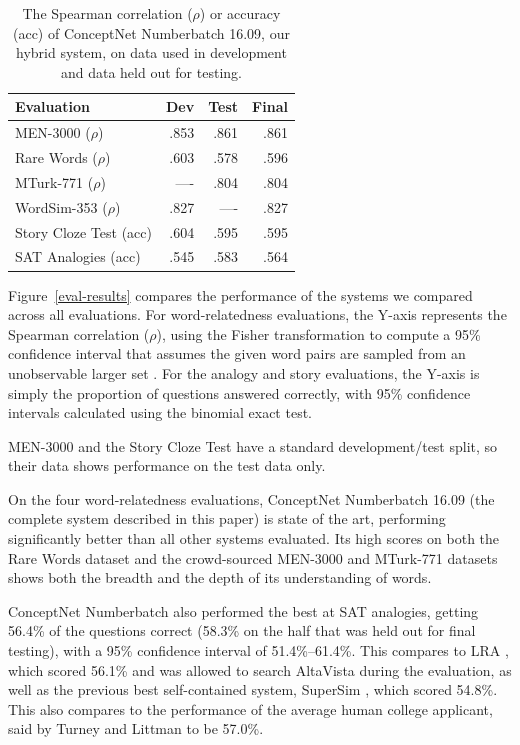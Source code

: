 \documentclass[letterpaper]{article}
\begin{document}
\begin{table}[t]
\centering
\begin{tabular}{lrrr}
\bf Evaluation     & \bf Dev & \bf Test & \bf Final \\
\hline
MEN-3000 ($\rho$)              & .853 & .861 & .861 \\
Rare Words ($\rho$)            & .603 & .578 & .596 \\
MTurk-771 ($\rho$)             & ---- & .804 & .804 \\
WordSim-353 ($\rho$)           & .827 & ---- & .827 \\
Story Cloze Test (acc)         & .604 & .595 & .595 \\
SAT Analogies (acc)            & .545 & .583 & .564 
\end{tabular}
\caption{The Spearman correlation ($\rho$) or accuracy (acc) of ConceptNet Numberbatch 16.09, our hybrid system,
on data used in development and data held out for testing.}
\end{table}

Figure~\ref{eval-results} compares the performance of the systems we compared
across all evaluations. For word-relatedness evaluations, the Y-axis represents
the Spearman correlation ($\rho$), using the Fisher transformation to compute a
95\% confidence interval that assumes the given word pairs are sampled from an
unobservable larger set \cite{bonett2000sample}. For the analogy and story evaluations,
the Y-axis is simply the proportion of questions answered correctly, with 95\%
confidence intervals calculated using the binomial exact test.

MEN-3000 and the Story Cloze Test have a standard development/test split, so
their data shows performance on the test data only.

On the four word-relatedness evaluations, ConceptNet Numberbatch 16.09 (the
complete system described in this paper) is state of the art, performing
significantly better than all other systems evaluated. Its high scores on both
the Rare Words dataset and the crowd-sourced MEN-3000 and MTurk-771 datasets
shows both the breadth and the depth of its understanding of words.

ConceptNet Numberbatch also performed the best at SAT analogies, getting 56.4\%
of the questions correct (58.3\% on the half that was held out for final
testing), with a 95\% confidence interval of 51.4\%--61.4\%.
This compares to LRA \cite{turney2005lra}, which scored 56.1\% and was
allowed to search AltaVista during the evaluation, as well as the previous best
self-contained system, SuperSim \cite{turney2013supersim}, which scored 54.8\%.
This also compares to the performance of the average human college applicant,
said by Turney and Littman to be 57.0\%.
\end{document}
